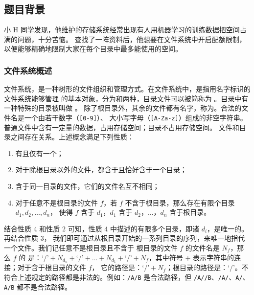 \subsection*{题目背景}

小 H 同学发现，他维护的存储系统经常出现有人用机器学习的训练数据把空间占满的问题，十分苦恼。
查找了一阵资料后，他想要在文件系统中开启配额限制，以便能够精确地限制大家在每个目录中最多能使用的空间。

\subsubsection*{文件系统概述}

文件系统，是一种树形的文件组织和管理方式。在文件系统中，{}是指用名字标识的文件系统能够管理
的基本对象，分为{}和{}两种，目录文件可以被简称为 {}。目录中有一种特殊的目录被叫做{} 。
除了根目录外，其余的文件都有名字，称为{}。合法的文件名是一个由若干数字（\verb|[0-9]|）、
大小写字母（\verb|[A-Za-z]|）组成的非空字符串。普通文件中含有一定量的数据，占用存储空间；目录不占用存储空间。
文件和目录之间存在{}关系。上述概念满足下列性质：

\begin{enumerate}

    \item 有且仅有一个{}；

    \item 对于除根目录以外的文件，都含于且恰好含于一个目录；

    \item 含于同一目录的文件，它们的文件名互不相同；

    \item 对于任意不是根目录的文件 $f$，若 $f$ 不含于根目录，那么存在有限个目录 $d_1, d_2, \dots, d_n$，
          使得 $f$ 含于 $d_1$，$d_1$ 含于 $d_2$，$\dots$，$d_n$ 含于根目录。

\end{enumerate}

结合性质 4 和性质 2 可知，性质 4 中描述的有限多个目录，即诸 $d_i$，是唯一的。再结合性质 3，
我们即可通过从根目录开始的一系列目录的序列，来唯一地指代一个文件。我们记任意不是根目录且不含于
根目录的文件 $f$ 的文件名是 $N_f$，那么 $f$ 的{} 是：$‘/’ + N_{d_n} + ‘/’ +
    \dots + N_{d_1} + ‘/’ + N_f$，其中符号 $+$ 表示字符串的连接；对于含于根目录的文件 $f$，
它的路径是：$‘/’ + N_f$；根目录的路径是：$‘/’$。不符合上述规定的路径都是非法的。例如：\verb|/A/B|
是合法路径，但 \verb|/A//B|、\verb|/A/|、\verb|A/|、\verb|A/B| 都不是合法路径。

